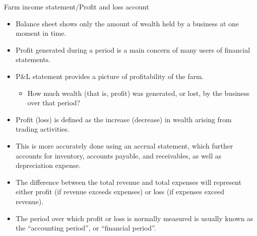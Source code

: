 \documentclass[12pt,ignorenonframetext,aspectratio=169]{beamer}
\providecommand{\tightlist}{%
  \setlength{\itemsep}{0pt}\setlength{\parskip}{0pt}}
\begin{document}
\begin{frame}{Farm income statement/Profit and loss account}
\protect\hypertarget{farm-income-statementprofit-and-loss-account}{}
\footnotesize

\begin{itemize}
\tightlist
\item
  Balance sheet shows only the amount of wealth held by a business at
  one moment in time.
\item
  Profit generated during a period is a main concern of many users of
  financial statements.
\item
  P\&L statement provides a picture of profitability of the farm.

  \begin{itemize}
  \tightlist
  \item
    How much wealth (that is, profit) was generated, or lost, by the
    business over that period?
  \end{itemize}
\item
  Profit (loss) is defined as the increase (decrease) in wealth arising
  from trading activities.
\item
  This is more accurately done using an accrual statement, which further
  accounts for inventory, accounts payable, and receivables, as well as
  depreciation expense.
\item
  The difference between the total revenue and total expenses will
  represent either profit (if revenue exceeds expenses) or loss (if
  expenses exceed revenue).
\item
  The period over which profit or loss is normally measured is usually
  known as the ``accounting period'', or ``financial period''.
\end{itemize}
\end{frame}
\end{document}
